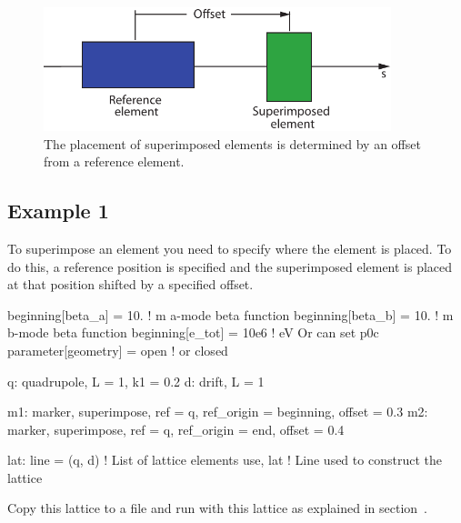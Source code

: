 \documentclass{hitec}
\begin{document}
\begin{figure}[tb]
  \centering
  \includegraphics[width=0.9\textwidth]{superimpose.pdf}
  \caption{The placement of superimposed elements is determined by an offset from a reference element.}
  \label{f:superimpose}
\end{figure}

\subsection{Example 1}

To superimpose an element you need to specify where the element is placed. To do this, a reference position is specified
and the superimposed element is placed at that position shifted by a specified offset.

\begin{code}
beginning[beta_a] = 10.   ! m  a-mode beta function
beginning[beta_b] = 10.   ! m  b-mode beta function
beginning[e_tot] = 10e6   ! eV   Or can set p0c
parameter[geometry] = open      ! or closed

q: quadrupole, L = 1, k1 = 0.2
d: drift, L = 1

m1: marker, superimpose, ref = q, ref_origin = beginning, offset = 0.3
m2: marker, superimpose, ref = q, ref_origin = end, offset = 0.4

lat: line = (q, d)   ! List of lattice elements
use, lat             ! Line used to construct the lattice
\end{code}

Copy this lattice to a file and run \tao with this lattice as explained in
section~. 
\end{document}
